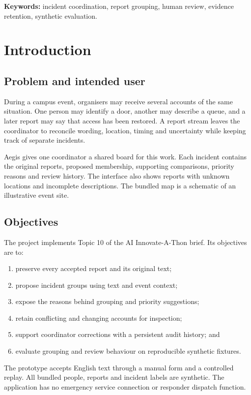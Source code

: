 \documentclass[11pt,a4paper]{article}
\begin{document}
\vspace{3mm}
\textbf{Keywords:} incident coordination, report grouping, human review, evidence retention, synthetic evaluation.

\vspace{5mm}
\tableofcontents
\clearpage
{}

\section{Introduction}
\subsection{Problem and intended user}
During a campus event, organisers may receive several accounts of the same situation. One person may identify a door, another may describe a queue, and a later report may say that access has been restored. A report stream leaves the coordinator to reconcile wording, location, timing and uncertainty while keeping track of separate incidents.

Aegis gives one coordinator a shared board for this work. Each incident contains the original reports, proposed membership, supporting comparisons, priority reasons and review history. The interface also shows reports with unknown locations and incomplete descriptions. The bundled map is a schematic of an illustrative event site.

\subsection{Objectives}
The project implements Topic 10 of the AI Innovate-A-Thon brief. Its objectives are to:
\begin{enumerate}
\item preserve every accepted report and its original text;
\item propose incident groups using text and event context;
\item expose the reasons behind grouping and priority suggestions;
\item retain conflicting and changing accounts for inspection;
\item support coordinator corrections with a persistent audit history; and
\item evaluate grouping and review behaviour on reproducible synthetic fixtures.
\end{enumerate}

The prototype accepts English text through a manual form and a controlled replay. All bundled people, reports and incident labels are synthetic. The application has no emergency service connection or responder dispatch function.
\end{document}
